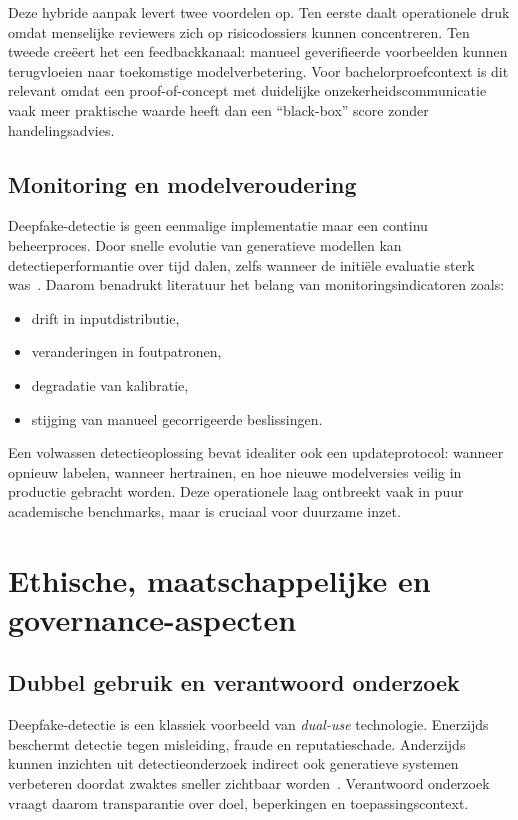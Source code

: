 Deze hybride aanpak levert twee voordelen op. Ten eerste daalt operationele druk omdat menselijke reviewers zich op risicodossiers kunnen concentreren. Ten tweede creëert het een feedbackkanaal: manueel geverifieerde voorbeelden kunnen terugvloeien naar toekomstige modelverbetering. Voor bachelorproefcontext is dit relevant omdat een proof-of-concept met duidelijke onzekerheidscommunicatie vaak meer praktische waarde heeft dan een ``black-box'' score zonder handelingsadvies.

\subsection{Monitoring en modelveroudering}
Deepfake-detectie is geen eenmalige implementatie maar een continu beheerproces. Door snelle evolutie van generatieve modellen kan detectieperformantie over tijd dalen, zelfs wanneer de initiële evaluatie sterk was~\autocite{Hasan2026,Pei2024}. Daarom benadrukt literatuur het belang van monitoringsindicatoren zoals:
\begin{itemize}
  \item drift in inputdistributie,
  \item veranderingen in foutpatronen,
  \item degradatie van kalibratie,
  \item stijging van manueel gecorrigeerde beslissingen.
\end{itemize}

Een volwassen detectieoplossing bevat idealiter ook een updateprotocol: wanneer opnieuw labelen, wanneer hertrainen, en hoe nieuwe modelversies veilig in productie gebracht worden. Deze operationele laag ontbreekt vaak in puur academische benchmarks, maar is cruciaal voor duurzame inzet.

\section{Ethische, maatschappelijke en governance-aspecten}

\subsection{Dubbel gebruik en verantwoord onderzoek}
Deepfake-detectie is een klassiek voorbeeld van \emph{dual-use} technologie. Enerzijds beschermt detectie tegen misleiding, fraude en reputatieschade. Anderzijds kunnen inzichten uit detectieonderzoek indirect ook generatieve systemen verbeteren doordat zwaktes sneller zichtbaar worden~\autocite{Hasan2026}. Verantwoord onderzoek vraagt daarom transparantie over doel, beperkingen en toepassingscontext.

